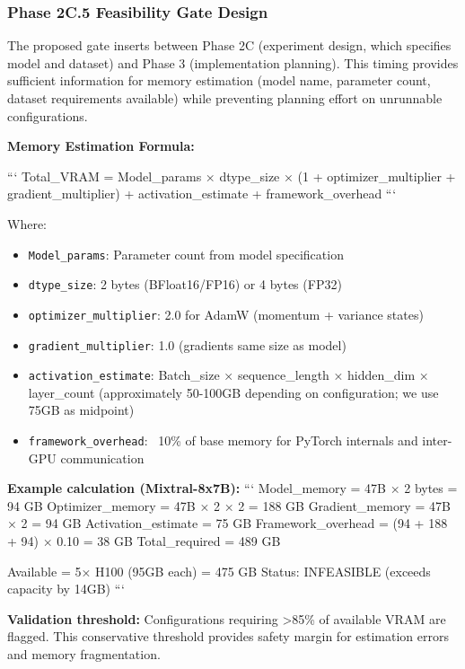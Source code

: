 
\subsubsection{Phase 2C.5 Feasibility Gate Design}

The proposed gate inserts between Phase 2C (experiment design, which specifies model and dataset) and Phase 3 (implementation planning). This timing provides sufficient information for memory estimation (model name, parameter count, dataset requirements available) while preventing planning effort on unrunnable configurations.

\textbf{Memory Estimation Formula:}

```
Total_VRAM = Model_params × dtype_size × (1 + optimizer_multiplier + gradient_multiplier) 
           + activation_estimate 
           + framework_overhead
```

Where:
\begin{itemize}
\item \texttt{Model_params}: Parameter count from model specification
\item \texttt{dtype_size}: 2 bytes (BFloat16/FP16) or 4 bytes (FP32)
\item \texttt{optimizer_multiplier}: 2.0 for AdamW (momentum + variance states)
\item \texttt{gradient_multiplier}: 1.0 (gradients same size as model)
\item \texttt{activation_estimate}: Batch_size × sequence_length × hidden_dim × layer_count (approximately 50-100GB depending on configuration; we use 75GB as midpoint)
\item \texttt{framework_overhead}: ~10\% of base memory for PyTorch internals and inter-GPU communication
\end{itemize}

\textbf{Example calculation (Mixtral-8x7B):}
```
Model_memory = 47B × 2 bytes = 94 GB
Optimizer_memory = 47B × 2 × 2 = 188 GB
Gradient_memory = 47B × 2 = 94 GB
Activation_estimate = 75 GB
Framework_overhead = (94 + 188 + 94) × 0.10 = 38 GB
Total_required = 489 GB

Available = 5× H100 (95GB each) = 475 GB
Status: INFEASIBLE (exceeds capacity by 14GB)
```

\textbf{Validation threshold:} Configurations requiring >85\% of available VRAM are flagged. This conservative threshold provides safety margin for estimation errors and memory fragmentation.

